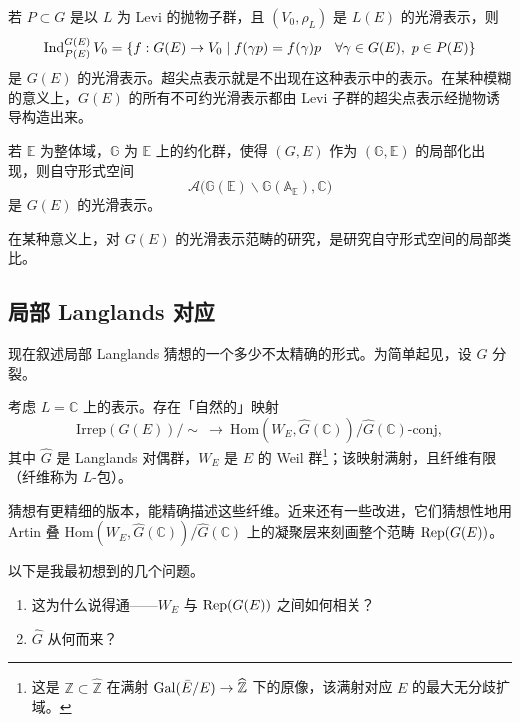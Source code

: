 \begin{example}[抛物诱导]
若 $P\subset G$ 是以 $L$ 为 Levi 的抛物子群，且 $(V_0,\rho_L)$ 是 $L(E)$ 的光滑表示，则
\[
\operatorname{Ind}_{P(E)}^{G(E)}V_0=\{f:G(E)\to V_0\mid f(\gamma p)=f(\gamma)p\quad\forall\gamma\in G(E),\ p\in P(E)\}
\]
是 $G(E)$ 的光滑表示。超尖点表示就是不出现在这种表示中的表示。在某种模糊的意义上，$G(E)$ 的所有不可约光滑表示都由 Levi 子群的超尖点表示经抛物诱导构造出来。
\end{example}

\begin{example}[自守表示]
若 $\mathbb{E}$ 为整体域，$\mathbb{G}$ 为 $\mathbb{E}$ 上的约化群，使得 $(G,E)$ 作为 $(\mathbb{G},\mathbb{E})$ 的局部化出现，则自守形式空间
\[
\mathcal{A}\bigl(\mathbb{G}(\mathbb{E})\backslash\mathbb{G}(\mathbb{A}_{\mathbb{E}}),\mathbb{C}\bigr)
\]
是 $G(E)$ 的光滑表示。
\end{example}

在某种意义上，对 $G(E)$ 的光滑表示范畴的研究，是研究自守形式空间的局部类比。


\subsection{局部 Langlands 对应}

现在叙述局部 Langlands 猜想的一个多少不太精确的形式。为简单起见，设 $G$ 分裂。

\begin{conjecture}[Langlands]
考虑 $L=\mathbb{C}$ 上的表示。存在「自然的」映射
\[
\mathrm{Irrep}(G(E))/\sim\ \longrightarrow\ \mathrm{Hom}(W_E,\widehat{G}(\mathbb{C}))/\widehat{G}(\mathbb{C})\text{-conj},
\]
其中 $\widehat{G}$ 是 Langlands 对偶群，$W_E$ 是 $E$ 的 Weil 群\footnote{这是 $\mathbb{Z}\subset\widehat{\mathbb{Z}}$ 在满射 $\operatorname{Gal}(\bar E/E)\to\widehat{\mathbb{Z}}$ 下的原像，该满射对应 $E$ 的最大无分歧扩域。}；该映射满射，且纤维有限（纤维称为 $L$-包）。
\end{conjecture}

\begin{remark}
猜想有更精细的版本，能精确描述这些纤维。近来还有一些改进，它们猜想性地用 Artin 叠 $\mathrm{Hom}(W_E,\widehat{G}(\mathbb{C}))/\widehat{G}(\mathbb{C})$ 上的凝聚层来刻画整个范畴 $\operatorname{Rep}(G(E))$。
\end{remark}

以下是我最初想到的几个问题。
\begin{enumerate}[label=(\arabic*)]
  \item 这为什么说得通——$W_E$ 与 $\operatorname{Rep}(G(E))$ 之间如何相关？
  \item $\widehat{G}$ 从何而来？
\end{enumerate}

